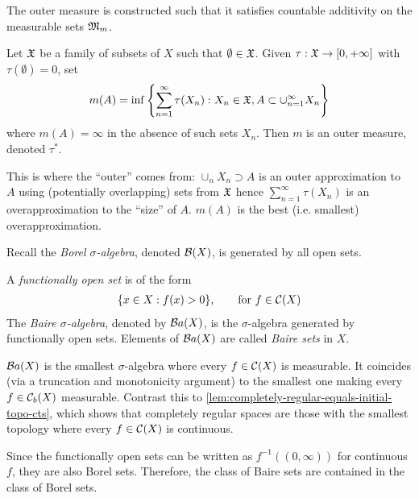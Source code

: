 \begin{remark}
  The outer measure is constructed such that it satisfies
  countable additivity on the measurable sets $\mathfrak{M}_m$.
\end{remark}

\begin{example}
  \label{eg:munroe-outer-meas}
  Let $\mathfrak{X}$ be a family of subsets of $X$ such that $\emptyset \in \mathfrak{X}$.
  Given $\tau : \mathfrak{X} \to [0,+\infty]$ with $\tau(\emptyset) = 0$, set
  \[
    m(A) = \inf\left\{
      \sum_{n=1}^\infty \tau(X_n) : X_n \in \mathfrak{X}, A \subset \cup_{n=1}^\infty X_n
    \right\}
  \]
  where $m(A) = \infty$ in the absence of such sets $X_n$.
  Then $m$ is an outer measure, denoted $\tau^*$.

  This is where the ``outer'' comes from: $\cup_n X_n \supset A$
  is an outer approximation to $A$ using (potentially overlapping)
  sets from $\mathfrak{X}$ hence $\sum_{n=1}^\infty \tau(X_n)$ is an overapproximation
  to the ``size'' of $A$. $m(A)$ is the best (i.e. smallest) overapproximation.
\end{example}

Recall the \emph{Borel $\sigma$-algebra}, denoted $\mathcal{B}(X)$, is generated by all
open sets.

\begin{definition}
  A \emph{functionally open set} is of the form
  \begin{align}
    \label{eq:functionally-open}
    \{x \in X : f(x) > 0 \}, \qquad\text{for}~f \in \mathcal{C}(X)
  \end{align}
  The \emph{Baire $\sigma$-algebra}, denoted by $\mathcal{B}a(X)$,
  is the $\sigma$-algebra generated by functionally open sets.
  Elements of $\mathcal{B}a(X)$ are called \emph{Baire sets} in $X$.
\end{definition}

\begin{remark}
  $\mathcal{B}a(X)$ is the smallest $\sigma$-algebra where every $f \in \mathcal{C}(X)$ is
  measurable. It coincides (via a truncation and monotonicity argument) to
  the smallest one making every $f \in \mathcal{C}_b(X)$ measurable.
  Contrast this to \cref{lem:completely-regular-equals-initial-topo-cts}, which
  shows that completely regular spaces are those with the smallest topology
  where every $f \in \mathcal{C}(X)$ is continuous.
\end{remark}

\begin{remark}
  Since the functionally open sets can be written as $f^{-1}((0, \infty))$
  for continuous $f$, they are also Borel sets. Therefore,
  the class of Baire sets are contained in the class of Borel sets.
\end{remark}

